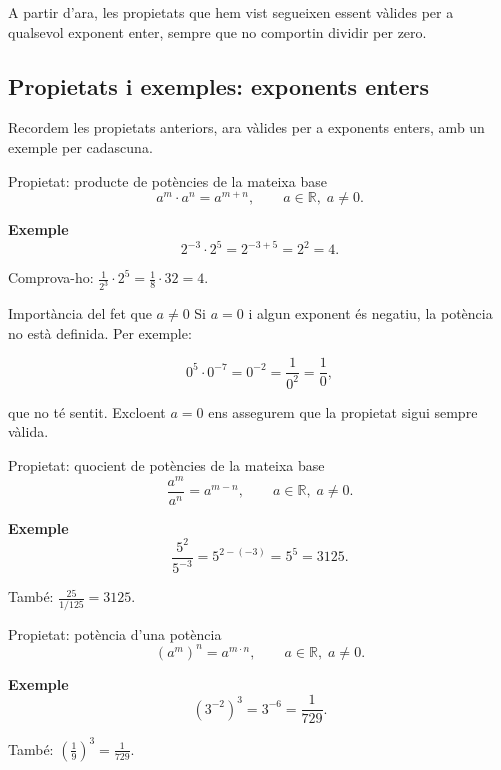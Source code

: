 A partir d'ara, les propietats que hem vist segueixen essent vàlides per a qualsevol exponent enter, sempre que no comportin dividir per zero.

\subsection{Propietats i exemples: exponents enters}

Recordem les propietats anteriors, ara vàlides per a exponents enters, amb un exemple per cadascuna.

\begin{propietat}{Propietat: producte de potències de la mateixa base}
\[
a^m \cdot a^n = a^{m+n}, \qquad a \in \mathbb{R},\; a \neq 0.
\]
\end{propietat}

\begin{exemple}{\textbf{Exemple}}
\[
2^{-3}\cdot 2^{5}=2^{-3+5}=2^2=4.
\]

Comprova-ho: $\tfrac{1}{2^3}\cdot 2^5=\tfrac{1}{8}\cdot 32=4$.
\end{exemple}

\begin{nota}{Importància del fet que $a\neq 0$}
Si $a=0$ i algun exponent és negatiu, la potència no està definida. Per exemple:

\[
0^{5}\cdot 0^{-7} =0^{-2}=\frac{1}{0^2}= \frac{1}{0},
\]

que no té sentit. Excloent $a=0$ ens assegurem que la propietat sigui sempre vàlida.
\end{nota}

\begin{propietat}{Propietat: quocient de potències de la mateixa base}
\[
\frac{a^m}{a^n} = a^{m-n}, \qquad a \in \mathbb{R},\; a \neq 0.
\]
\end{propietat}

\begin{exemple}{\textbf{Exemple}}
\[
\frac{5^2}{5^{-3}} = 5^{2-(-3)}=5^5=3125.
\]

També: $\tfrac{25}{1/125}=3125$.
\end{exemple}

\begin{propietat}{Propietat: potència d'una potència}
\[
\left(a^m\right)^n = a^{m \cdot n}, \qquad a \in \mathbb{R},\; a \neq 0.
\]
\end{propietat}

\begin{exemple}{\textbf{Exemple}}
\[
\left(3^{-2}\right)^3 = 3^{-6} = \frac{1}{729}.
\]

També: $\left(\tfrac{1}{9}\right)^3=\tfrac{1}{729}$.
\end{exemple}

